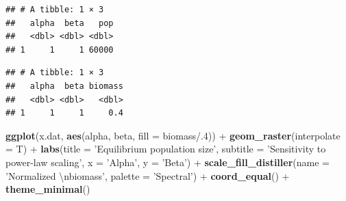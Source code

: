 \documentclass[]{article}
\newenvironment{Shaded}{}{}
\newcommand{\KeywordTok}[1]{\textcolor[rgb]{0.00,0.44,0.13}{\textbf{{#1}}}}
\newcommand{\DataTypeTok}[1]{\textcolor[rgb]{0.56,0.13,0.00}{{#1}}}
\newcommand{\DecValTok}[1]{\textcolor[rgb]{0.25,0.63,0.44}{{#1}}}
\newcommand{\CharTok}[1]{\textcolor[rgb]{0.25,0.44,0.63}{{#1}}}
\newcommand{\StringTok}[1]{\textcolor[rgb]{0.25,0.44,0.63}{{#1}}}
\newcommand{\NormalTok}[1]{{#1}}
\begin{document}
\begin{Shaded}
\end{Shaded}

\begin{verbatim}
## # A tibble: 1 × 3
##   alpha  beta   pop
##   <dbl> <dbl> <dbl>
## 1     1     1 60000
\end{verbatim}

\begin{Shaded}
\end{Shaded}

\begin{verbatim}
## # A tibble: 1 × 3
##   alpha  beta biomass
##   <dbl> <dbl>   <dbl>
## 1     1     1     0.4
\end{verbatim}

\begin{Shaded}
\begin{Highlighting}[]
\KeywordTok{ggplot}\NormalTok{(x.dat, }\KeywordTok{aes}\NormalTok{(alpha, beta, }\DataTypeTok{fill =} \NormalTok{biomass/.}\DecValTok{4}\NormalTok{)) +}
\StringTok{  }\KeywordTok{geom_raster}\NormalTok{(}\DataTypeTok{interpolate =} \NormalTok{T) +}
\StringTok{  }\KeywordTok{labs}\NormalTok{(}\DataTypeTok{title =} \StringTok{'Equilibrium population size'}\NormalTok{, }\DataTypeTok{subtitle =} \StringTok{'Sensitivity to power-law scaling'}\NormalTok{, }\DataTypeTok{x =} \StringTok{'Alpha'}\NormalTok{, }\DataTypeTok{y =} \StringTok{'Beta'}\NormalTok{) +}
\StringTok{  }\KeywordTok{scale_fill_distiller}\NormalTok{(}\DataTypeTok{name =} \StringTok{'Normalized }\CharTok{\textbackslash{}n}\StringTok{biomass'}\NormalTok{, }\DataTypeTok{palette =} \StringTok{'Spectral'}\NormalTok{) +}
\StringTok{  }\KeywordTok{coord_equal}\NormalTok{() +}
\StringTok{  }\KeywordTok{theme_minimal}\NormalTok{()}
\end{Highlighting}
\end{Shaded}
\end{document}
